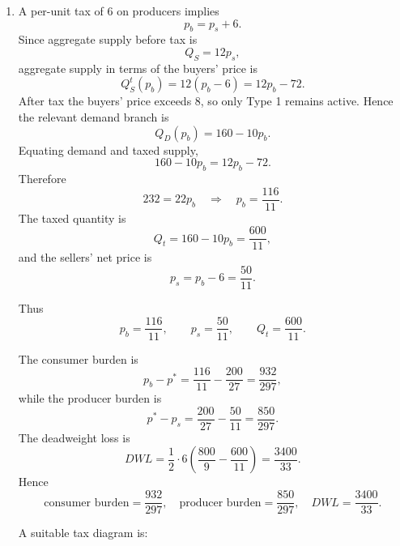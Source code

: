 \documentclass[12pt]{article}
\begin{document}
\begin{enumerate}[label=(\alph*)]
    \item
    A per-unit tax of \(6\) on producers implies
    \[
    p_b=p_s+6.
    \]
    Since aggregate supply before tax is
    \[
    Q_S=12p_s,
    \]
    aggregate supply in terms of the buyers' price is
    \[
    Q_S^t(p_b)=12(p_b-6)=12p_b-72.
    \]
    After tax the buyers' price exceeds 8, so only Type 1 remains active. Hence the relevant demand branch is
    \[
    Q_D(p_b)=160-10p_b.
    \]
    Equating demand and taxed supply,
    \[
    160-10p_b=12p_b-72.
    \]
    Therefore
    \[
    232=22p_b
    \quad\Longrightarrow\quad
    p_b=\frac{116}{11}.
    \]
    The taxed quantity is
    \[
    Q_t=160-10p_b=\frac{600}{11},
    \]
    and the sellers' net price is
    \[
    p_s=p_b-6=\frac{50}{11}.
    \]

    Thus
    \[
    \boxed{p_b=\frac{116}{11},\qquad p_s=\frac{50}{11},\qquad Q_t=\frac{600}{11}.}
    \]

    The consumer burden is
    \[
    p_b-p^*=\frac{116}{11}-\frac{200}{27}=\frac{932}{297},
    \]
    while the producer burden is
    \[
    p^*-p_s=\frac{200}{27}-\frac{50}{11}=\frac{850}{297}.
    \]
    The deadweight loss is
    \[
    DWL=\frac12\cdot 6\left(\frac{800}{9}-\frac{600}{11}\right)
    =\frac{3400}{33}.
    \]
    Hence
    \[
    \boxed{\text{consumer burden}=\frac{932}{297},\quad \text{producer burden}=\frac{850}{297},\quad DWL=\frac{3400}{33}.}
    \]

    A suitable tax diagram is:

    \begin{center}
\end{center}
\end{enumerate}
\end{document}
